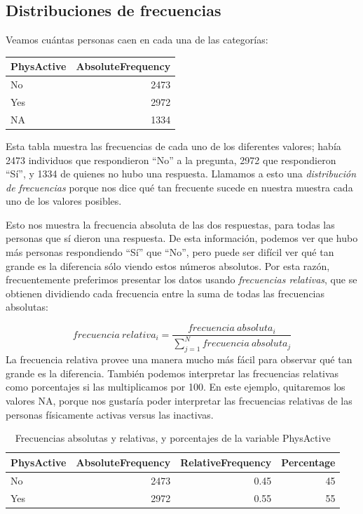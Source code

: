 \documentclass[
  12pt,
]{book}
\begin{document}
\hypertarget{frequency-distributions}{%
\subsection{Distribuciones de frecuencias}\label{frequency-distributions}}

Veamos cuántas personas caen en cada una de las categorías:

\begin{tabular}{l|r}
\hline
PhysActive & AbsoluteFrequency\\
\hline
No & 2473\\
\hline
Yes & 2972\\
\hline
NA & 1334\\
\hline
\end{tabular}

Esta tabla muestra las frecuencias de cada uno de los diferentes valores; había 2473 individuos que respondieron ``No'' a la pregunta, 2972 que respondieron ``Sí'', y 1334 de quienes no hubo una respuesta. Llamamos a esto una \emph{distribución de frecuencias} porque nos dice qué tan frecuente sucede en nuestra muestra cada uno de los valores posibles.

Esto nos muestra la frecuencia absoluta de las dos respuestas, para todas las personas que sí dieron una respuesta. De esta información, podemos ver que hubo más personas respondiendo ``Sí'' que ``No'', pero puede ser difícil ver qué tan grande es la diferencia sólo viendo estos números absolutos. Por esta razón, frecuentemente preferimos presentar los datos usando \emph{frecuencias relativas}, que se obtienen dividiendo cada frecuencia entre la suma de todas las frecuencias absolutas:

\[
frecuencia\ relativa_i = \frac{frecuencia\ absoluta_i}{\sum_{j=1}^N frecuencia\ absoluta_j}
\]
La frecuencia relativa provee una manera mucho más fácil para observar qué tan grande es la diferencia. También podemos interpretar las frecuencias relativas como porcentajes si las multiplicamos por 100. En este ejemplo, quitaremos los valores NA, porque nos gustaría poder interpretar las frecuencias relativas de las personas físicamente activas versus las inactivas.

\begin{table}

\caption{\label{tab:unnamed-chunk-5}Frecuencias absolutas y relativas, y porcentajes de la variable PhysActive}
\centering
\begin{tabular}[t]{l|r|r|r}
\hline
PhysActive & AbsoluteFrequency & RelativeFrequency & Percentage\\
\hline
No & 2473 & 0.45 & 45\\
\hline
Yes & 2972 & 0.55 & 55\\
\hline
\end{tabular}
\end{table}
\end{document}
